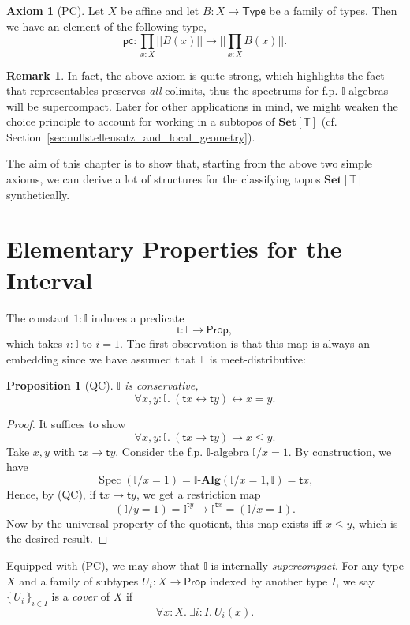 \documentclass[12pt]{amsart}
\newtheorem{proposition}[theorem]{Proposition}
\theoremstyle{definition}
\newtheorem{remark}[theorem]{Remark}
\newtheorem{axiom}{Axiom}
\newcommand{\mb}[1]{\mathbf{#1}}
\newcommand{\mbb}[1]{\mathbb{#1}}
\newcommand{\T}{\mbb T}
\newcommand{\I}{\mbb I}
\newcommand{\ms}[1]{\mathsf{#1}}
\newcommand{\Set}{\mb{Set}}
\newcommand{\alg}{\text{-}\mb{Alg}}
\newcommand{\set}[1]{\{\,#1\,\}}
\newcommand{\fa}[2]{\forall #1\!\colon\!\!#2.\ }
\newcommand{\ex}[2]{\exists #1\!\colon\!\!#2.\ }
\newcommand{\eq}{\leftrightarrow}
\newcommand{\pss}[1]{||#1||} %
\newcommand{\tp}{\ms{Type}}
\newcommand{\pp}{\ms{Prop}}
\newcommand{\spec}{\operatorname{Spec}}
\begin{document}
\begin{axiom}[PC]\label{ax:pchoice}
  Let $X$ be affine and let $B : X \to \tp$ be a family of types. Then we have an element of the following type,
  \[ \ms{pc} : \prod_{x:X}\pss{B(x)} \to \pss{\prod_{x:X}B(x)}. \]
\end{axiom}

\begin{remark}
  In fact, the above axiom is quite strong, which highlights the fact that representables preserves \emph{all} colimits, thus the spectrums for f.p. $\I$-algebras will be supercompact. Later for other applications in mind, we might weaken the choice principle to account for working in a subtopos of $\Set[\T]$ (cf. Section~\ref{sec:nullstellensatz_and_local_geometry}).
\end{remark}

The aim of this chapter is to show that, starting from the above two simple axioms, we can derive a lot of structures for the classifying topos $\Set[\T]$ synthetically.

\section{Elementary Properties for the Interval}

The constant $1 : \I$ induces a predicate
\[ \ms t : \I \to \pp, \]
which takes $i : \I$ to $i = 1$. The first observation is that this map is always an embedding since we have assumed that $\T$ is meet-distributive:

\begin{proposition}[QC]\label{prop:intconserve}
  $\I$ is conservative,
  \[ \fa{x,y}{\I} (\ms tx \eq \ms ty) \eq x = y. \]
\end{proposition}
\begin{proof}
  It suffices to show
  \[ \fa{x,y}{\I}(\ms tx \to \ms ty) \to x \le y. \]
  Take $x,y$ with $\ms tx \to \ms ty$. Consider the f.p. $\I$-algebra $\I/x=1$. By construction, we have
  \[ \spec(\I/x=1) = \I\alg(\I/x=1,\I) = \ms tx, \]
  Hence, by (QC), if $\ms tx \to \ms ty$, we get a restriction map
  \[ (\I/y=1) = \I^{\ms ty} \to \I^{\ms tx} = (\I/x=1). \]
  Now by the universal property of the quotient, this map exists iff $x \le y$, which is the desired result.
\end{proof}

Equipped with (PC), we may show that $\I$ is internally \emph{supercompact}. For any type $X$ and a family of subtypes $U_i : X \to \pp$ indexed by another type $I$, we say $\set{U_i}_{i\in I}$ is a \emph{cover} of $X$ if
\[ \fa xX \ex i{I} U_i(x). \]
\end{document}
